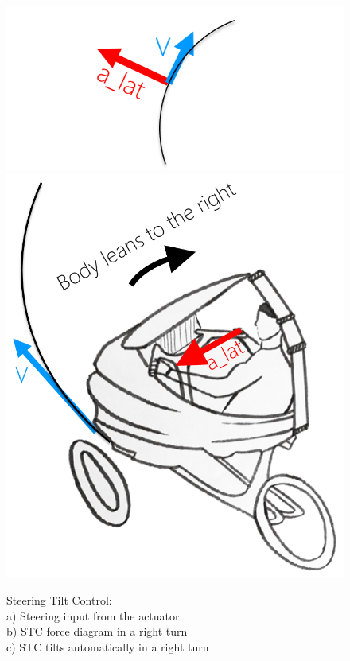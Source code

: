\begin{itemize}
\begin{itemize}
\begin{figure}[h]
		\endminipage\hfill
		  \includegraphics[width=1.2\linewidth]{figs/02/stc_2}
		\endminipage\hfill
		  \includegraphics[width=1.0\linewidth]{figs/02/stc_3}
		\endminipage
		\caption{Steering Tilt Control: \protect\\a) Steering input from the actuator \protect\\b) STC force diagram in a right turn \protect\\c) STC tilts automatically in a right turn}
		\label{stc}
	\end{figure}
	\end{itemize}
\end{itemize}
